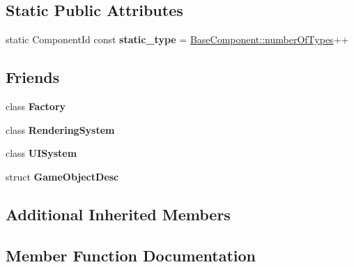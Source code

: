 \subsection*{Static Public Attributes}
\begin{DoxyCompactItemize}
\item 
\mbox{\label{classRendererComponent_a03684f768caa23cc09be9998da14d0a4}} 
static Component\+Id const {\bfseries static\+\_\+type} = \hyperlink{classBaseComponent_a084ade347bc71a7f0d3b17ecdc2225a4}{Base\+Component\+::number\+Of\+Types}++
\end{DoxyCompactItemize}
\subsection*{Friends}
\begin{DoxyCompactItemize}
\item 
\mbox{\label{classRendererComponent_a328c093d609680cca505905c6d49901a}} 
class {\bfseries Factory}
\item 
\mbox{\label{classRendererComponent_a8973bdd326799bb9e3e2d3bf6c98778d}} 
class {\bfseries Rendering\+System}
\item 
\mbox{\label{classRendererComponent_a3c5cff3eae5326599fd1851d48d2a07b}} 
class {\bfseries U\+I\+System}
\item 
\mbox{\label{classRendererComponent_a23d2fc1faa79753953263847a5a4f553}} 
struct {\bfseries Game\+Object\+Desc}
\end{DoxyCompactItemize}
\subsection*{Additional Inherited Members}


\subsection{Member Function Documentation}
\mbox{\label{classRendererComponent_a169372f7e5068ad4095923c694372d7f}} 

